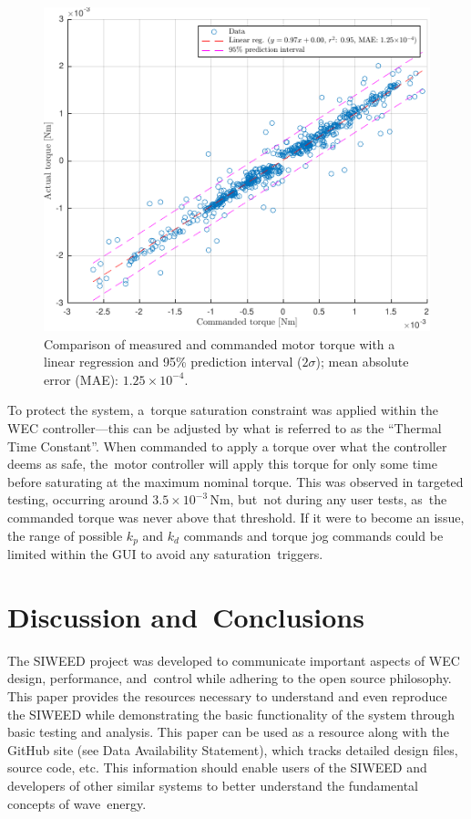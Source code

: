 \documentclass[hardware,article,submit,pdftex,moreauthors]{Definitions/mdpi}
\begin{document}
\begin{figure}[H]
  \centering
  \includegraphics[width=1\textwidth]{diagrams/PDverification.pdf}
  \caption{Comparison %
 of measured and commanded motor torque with a linear regression and 95\% prediction interval ($2\sigma$); mean absolute error (MAE): $1.25\times{10}^{-4}$.}
  \label{fig:TorqueCommanded}
\end{figure}

To protect the system, a~torque saturation constraint was applied within the WEC controller---this can be adjusted by what is referred to as the ``Thermal Time Constant''.
When commanded to apply a torque over what the controller deems as safe, the~motor controller will apply this torque for only some time before saturating at the maximum nominal torque.
This was observed in targeted testing, occurring around $3.5\times 10^{-3}$\,Nm, but~not during any user tests, as~the commanded torque was never above that threshold.
If it were to become an issue, the range of possible $k_p$ and $k_d$ commands and torque jog commands could be limited within the GUI to avoid any saturation~triggers.

\section{Discussion and~Conclusions}
The SIWEED project was developed to communicate important aspects of WEC design, performance, and~control while adhering to the open source philosophy.
This paper provides the resources necessary to understand and even reproduce the SIWEED while demonstrating the basic functionality of the system through basic testing and analysis.
This paper can be used as a resource along with the GitHub site (see Data Availability Statement), which tracks detailed design files, source code, etc.
This information should enable users of the SIWEED and developers of other similar systems to better understand the fundamental concepts of wave~energy.
\end{document}

